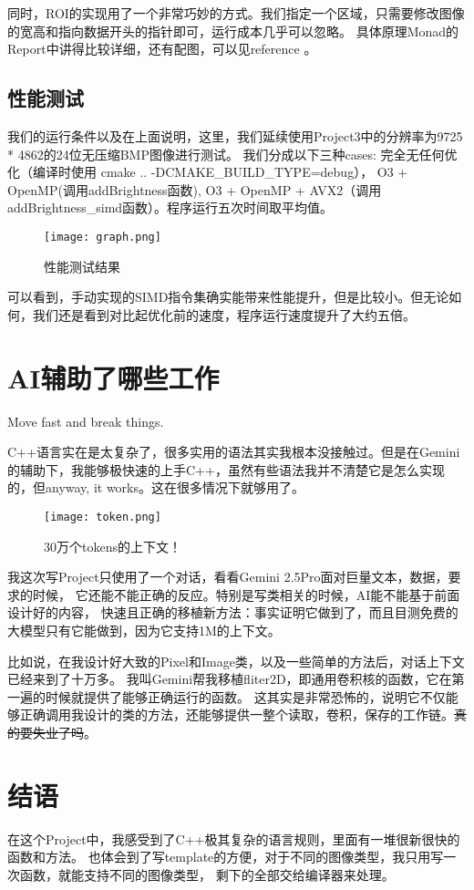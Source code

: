 \documentclass[11pt]{article}
\begin{document}
同时，ROI的实现用了一个非常巧妙的方式。我们指定一个区域，只需要修改图像的宽高和指向数据开头的指针即可，运行成本几乎可以忽略。
具体原理Monad的Report中讲得比较详细，还有配图，可以见reference \cite{Monad2022}。

\subsection{性能测试}
我们的运行条件以及在上面说明，这里，我们延续使用Project3中的分辨率为9725 * 4862的24位无压缩BMP图像进行测试。
我们分成以下三种cases: 完全无任何优化（编译时使用 cmake .. -DCMAKE\_BUILD\_TYPE=debug），
O3 + OpenMP(调用addBrightness函数), O3 + OpenMP + AVX2（调用addBrightness\_simd函数）。程序运行五次时间取平均值。
\begin{figure}[H]
  \centering
  \texttt{[image: graph.png]}
  \caption{性能测试结果}
  \label{fig:input}
\end{figure}
可以看到，手动实现的SIMD指令集确实能带来性能提升，但是比较小。但无论如何，我们还是看到对比起优化前的速度，程序运行速度提升了大约五倍。


\section{AI辅助了哪些工作}
Move fast and break things.


C++语言实在是太复杂了，很多实用的语法其实我根本没接触过。但是在Gemini的辅助下，我能够极快速的上手C++，虽然有些语法我并不清楚它是怎么实现的，但anyway, it works。这在很多情况下就够用了。
\begin{figure}[H]
  \centering
  \texttt{[image: token.png]}
  \caption{30万个tokens的上下文！}
  \label{fig:input}
\end{figure}


我这次写Project只使用了一个对话，看看Gemini 2.5Pro面对巨量文本，数据，要求的时候，
它还能不能正确的反应。特别是写类相关的时候，AI能不能基于前面设计好的内容，
快速且正确的移植新方法：事实证明它做到了，而且目测免费的大模型只有它能做到，因为它支持1M的上下文。


比如说，在我设计好大致的Pixel和Image类，以及一些简单的方法后，对话上下文已经来到了十万多。
我叫Gemini帮我移植fliter2D，即通用卷积核的函数，它在第一遍的时候就提供了能够正确运行的函数。
这其实是非常恐怖的，说明它不仅能够正确调用我设计的类的方法，还能够提供一整个读取，卷积，保存的工作链。\sout{真的要失业了吗}。



\section{结语}
在这个Project中，我感受到了C++极其复杂的语言规则，里面有一堆很新很快的函数和方法。
也体会到了写template的方便，对于不同的图像类型，我只用写一次函数，就能支持不同的图像类型，
剩下的全部交给编译器来处理。
\end{document}
